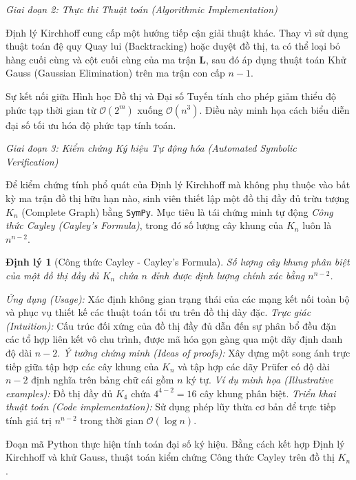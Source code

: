 \documentclass{article}
\newtheorem{dinhly}{Định lý}
\begin{document}
\vspace{0.5em}\noindent\emph{Giai đoạn 2: Thực thi Thuật toán (Algorithmic Implementation)}

Định lý Kirchhoff cung cấp một hướng tiếp cận giải thuật khác. Thay vì sử dụng thuật toán đệ quy Quay lui (Backtracking) hoặc duyệt đồ thị, ta có thể loại bỏ hàng cuối cùng và cột cuối cùng của ma trận $\mathbf{L}$, sau đó áp dụng thuật toán Khử Gauss (Gaussian Elimination) trên ma trận con cấp $n-1$.

Sự kết nối giữa Hình học Đồ thị và Đại số Tuyến tính cho phép giảm thiểu độ phức tạp thời gian từ $\mathcal{O}(2^m)$ xuống $\mathcal{O}(n^3)$. Điều này minh họa cách biểu diễn đại số tối ưu hóa độ phức tạp tính toán.

\vspace{0.5em}\noindent\emph{Giai đoạn 3: Kiểm chứng Ký hiệu Tự động hóa (Automated Symbolic Verification)}

Để kiểm chứng tính phổ quát của Định lý Kirchhoff mà không phụ thuộc vào bất kỳ ma trận đồ thị hữu hạn nào, sinh viên thiết lập một đồ thị đầy đủ trừu tượng $K_n$ (Complete Graph) bằng \texttt{\textsf{SymPy}}. Mục tiêu là tái chứng minh tự động \textit{Công thức Cayley (Cayley's Formula)}, trong đó số lượng cây khung của $K_n$ luôn là $n^{n-2}$.

\begin{dinhly}[Công thức Cayley - Cayley's Formula]
Số lượng cây khung phân biệt của một đồ thị đầy đủ $K_n$ chứa $n$ đỉnh được định lượng chính xác bằng $n^{n-2}$.
\end{dinhly}
\emph{Ứng dụng (Usage):} Xác định không gian trạng thái của các mạng kết nối toàn bộ và phục vụ thiết kế các thuật toán tối ưu trên đồ thị dày đặc.
\emph{Trực giác (Intuition):} Cấu trúc đối xứng của đồ thị đầy đủ dẫn đến sự phân bổ đều đặn các tổ hợp liên kết vô chu trình, được mã hóa gọn gàng qua một dãy định danh độ dài $n-2$.
\emph{Ý tưởng chứng minh (Ideas of proofs):} Xây dựng một song ánh trực tiếp giữa tập hợp các cây khung của $K_n$ và tập hợp các dãy Prüfer có độ dài $n-2$ định nghĩa trên bảng chữ cái gồm $n$ ký tự.
\emph{Ví dụ minh họa (Illustrative examples):} Đồ thị đầy đủ $K_4$ chứa $4^{4-2} = 16$ cây khung phân biệt.
\emph{Triển khai thuật toán (Code implementation):} Sử dụng phép lũy thừa cơ bản để trực tiếp tính giá trị $n^{n-2}$ trong thời gian $\mathcal{O}(\log n)$.

Đoạn mã Python thực hiện tính toán đại số ký hiệu. Bằng cách kết hợp Định lý Kirchhoff và khử Gauss, thuật toán kiểm chứng Công thức Cayley trên đồ thị $K_n$.
\end{document}
